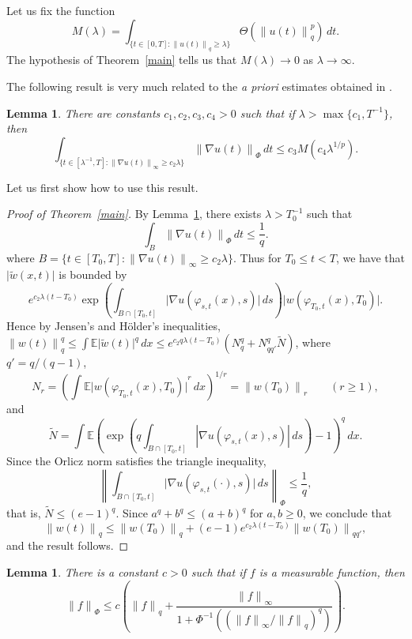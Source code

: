 \documentclass[12pt]{amsart}
\newtheorem{lemma}[thm]{Lemma}
\theoremstyle{remark}
\newcommand{\E}{{\mathbb E}}
\newcommand{\modo}[1]{{\left|#1\right|}}
\newcommand{\normo}[1]{{\left\|#1\right\|}}
\newcommand{\smodo}[1]{{\mathopen|#1\mathclose|}}
\newcommand{\snormo}[1]{{\mathopen\|#1\mathclose\|}}
\begin{document}
Let us fix the function
$$ M(\lambda) = 
   \int_{\{t\in[0,T] \colon \snormo{u(t)}_q \ge \lambda\}}
   \Theta(\snormo{u(t)}_q^p) \, dt .$$
The hypothesis of Theorem~\ref{main} tells us that
 $M(\lambda) \to 0$ as $\lambda \to \infty$.

The following result is very much related to the \emph{a priori} estimates
obtained in \cite{foias et al}.

\begin{lemma}
\label{localization to integral}
There are constants $c_1,c_2,c_3,c_4>0$ 
such that if
$\lambda>\max\{c_1,T^{-1}\}$,
then
$$ \int_{\{t \in [\lambda^{-1},T] \colon
         \snormo{\nabla u(t)}_\infty \ge c_2 \lambda\}}
   \snormo{\nabla u(t)}_{\Phi} \, dt \le c_3 M(c_4\lambda^{1/p}) .$$
\end{lemma}

Let us first show how to use this result.

\begin{proof}[Proof of Theorem~\ref{main}]
By Lemma~\ref{localization to integral}, there exists $\lambda>T_0^{-1}$ such
that
$$ \int_{B}
   \snormo{\nabla u(t)}_{\Phi} \, dt \le \frac1q .$$
where 
$B = \{t \in [T_0,T] \colon \snormo{\nabla u(t)}_\infty \ge c_2 \lambda\}$.
Thus for $T_0 \le t < T$, we have that $\smodo{\tilde w(x,t)}$ is bounded
by
$$ e^{c_2 \lambda (t-T_0)}
   \exp\left(\int_{B\cap[T_0,t]} 
   \smodo{\nabla u(\varphi_{s,t}(x),s)} \, ds\right)
   \smodo{w(\varphi_{T_0,t}(x),T_0)} .$$
Hence by Jensen's and
H\"older's inequalities, $\snormo{w(t)}_{q}^{q} \le 
\int \E\smodo{\tilde w(t)}^{q} \, dx \le 
e^{c_2 q \lambda (t-T_0)}(N_q^q + N_{qq'}^q \tilde N)$, where
$q' = q/(q-1)$, 
$$
   N_r
   =
   \left(\int \E \smodo{w(\varphi_{T_0,t}(x),T_0)}^r\,dx\right)^{1/r} 
   = \snormo{w(T_0)}_r \qquad (r \ge 1), $$
and
$$
   \tilde N
   =
   \int \E \left(
   \exp\left(q\int_{B \cap [T_0,t]}
   \modo{\nabla u(\varphi_{s,t}(x),s)} \, ds \right) - 1 \right)^q
   \, dx .
$$
Since the Orlicz norm satisfies the triangle inequality, 
$$ \normo{\int_{B\cap[T_0,t]} \smodo{\nabla u(\varphi_{s,t}(\cdot),s)} \, ds}
    _\Phi \le \frac1q ,$$
that is, $\tilde N \le (e-1)^q $.
Since $a^q + b^q \le (a+b)^q$ for $a,b \ge 0$,
we conclude that 
$$ \snormo{w(t)}_q \le \snormo{w(T_0)}_q + 
   (e-1) e^{c_2 \lambda (t-T_0)} \snormo{w(T_0)}_{qq'} ,$$
and the result follows.
\end{proof}

\begin{lemma}  \label{upper bound for L_Phi}
There is a constant $c>0$ such that if $f$ is a measurable
function, then
$$
  \snormo f_\Phi \le c
  \left(\snormo f_q + 
  \frac{\snormo f_\infty}{1+\Phi^{-1}(({\snormo f_\infty}/{\snormo f_q})^q)}
  \right) .$$
\end{lemma}
\end{document}
